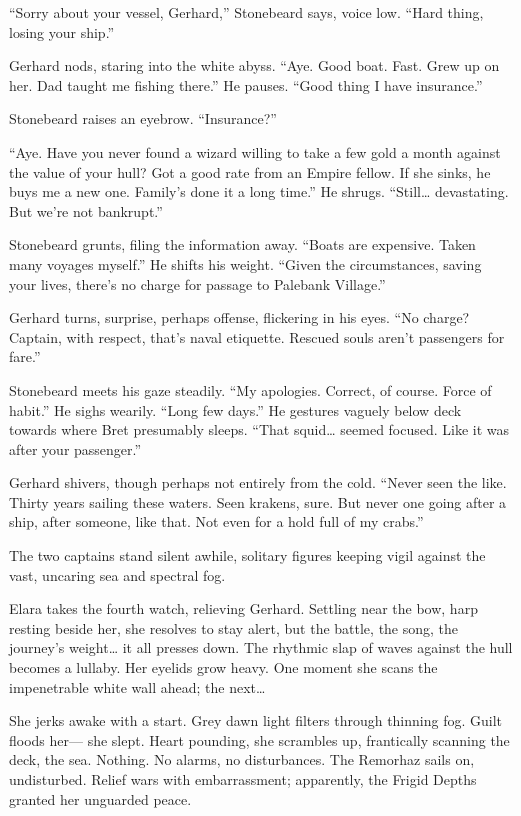 \documentclass[
  letterpaper,12pt,twoside,twocolumn,openany,
  nodeprecatedcode,bg=full]{dndbook}
\begin{document}
``Sorry about your vessel, Gerhard,'' Stonebeard says, voice low. ``Hard
thing, losing your ship.''

Gerhard nods, staring into the white abyss. ``Aye. Good boat. Fast. Grew
up on her. Dad taught me fishing there.'' He pauses. ``Good thing I have
insurance.''

Stonebeard raises an eyebrow. ``Insurance?''

``Aye. Have you never found a wizard willing to take a few gold a month
against the value of your hull? Got a good rate from an Empire fellow.
If she sinks, he buys me a new one. Family's done it a long time.'' He
shrugs. ``Still\ldots{} devastating. But we're not bankrupt.''

Stonebeard grunts, filing the information away. ``Boats are expensive.
Taken many voyages myself.'' He shifts his weight. ``Given the
circumstances, saving your lives, there's no charge for passage to
Palebank Village.''

Gerhard turns, surprise, perhaps offense, flickering in his eyes. ``No
charge? Captain, with respect, that's naval etiquette. Rescued souls
aren't passengers for fare.''

Stonebeard meets his gaze steadily. ``My apologies. Correct, of course.
Force of habit.'' He sighs wearily. ``Long few days.'' He gestures
vaguely below deck towards where Bret presumably sleeps. ``That
squid\ldots{} seemed focused. Like it was after your passenger.''

Gerhard shivers, though perhaps not entirely from the cold. ``Never seen
the like. Thirty years sailing these waters. Seen krakens, sure. But
never one going after a ship, after someone, like that. Not even for a
hold full of my crabs.''

The two captains stand silent awhile, solitary figures keeping vigil
against the vast, uncaring sea and spectral fog.

Elara takes the fourth watch, relieving Gerhard. Settling near the bow,
harp resting beside her, she resolves to stay alert, but the battle, the
song, the journey's weight\ldots{} it all presses down. The rhythmic
slap of waves against the hull becomes a lullaby. Her eyelids grow
heavy. One moment she scans the impenetrable white wall ahead; the
next\ldots{}

She jerks awake with a start. Grey dawn light filters through thinning
fog. Guilt floods her--- she slept. Heart pounding, she scrambles up,
frantically scanning the deck, the sea. Nothing. No alarms, no
disturbances. The Remorhaz sails on, undisturbed. Relief wars with
embarrassment; apparently, the Frigid Depths granted her unguarded
peace.
\end{document}
